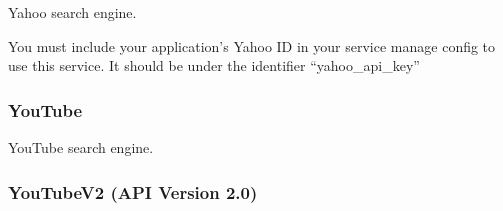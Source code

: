 \documentclass[letterpaper,10pt,english]{sphinxmanual}
\begin{document}
\begin{fulllineitems}
\label{api2.0:puppy.search.engine.Yahoo}
Yahoo search engine.

You must include your application's Yahoo ID in your service manage config to use this service. It should be under the identifier ``yahoo\_api\_key''

\end{fulllineitems}



\subsubsection{YouTube}
\label{api2.0:youtube}

\begin{fulllineitems}
\label{api2.0:puppy.search.engine.YouTube}
YouTube search engine.

\end{fulllineitems}



\subsubsection{YouTubeV2 (API Version 2.0)}
\label{api2.0:youtubev2-api-version-2-0}
\end{document}
